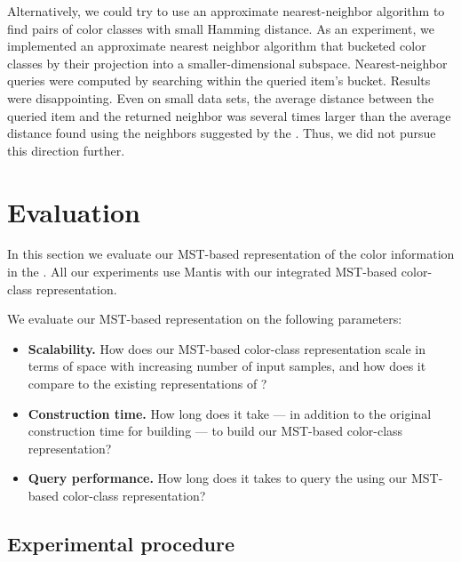 Alternatively, we could try to use an approximate nearest-neighbor
algorithm to find pairs of color classes with small Hamming distance.
As an experiment, we implemented an approximate nearest neighbor
algorithm that bucketed color classes by their projection into
a smaller-dimensional subspace.  Nearest-neighbor queries were
computed by searching within the queried item's bucket.
Results were disappointing.  Even on small data sets, the average
distance between the queried item and the returned neighbor
was several times larger than the average distance found using
the neighbors suggested by the \dbg.  Thus, we did not pursue
this direction further.

\section{Evaluation}
\label{sec:mantis_eval}

In this section we evaluate our MST-based representation of the color
information in the \cdbg.  All our experiments use Mantis with
our integrated MST-based color-class representation.


We evaluate our MST-based representation on the following parameters:
\begin{itemize}
    \item \textbf{Scalability.} How does our MST-based color-class representation
    scale in terms of space with increasing number of input samples, and how does
    it compare to the existing representations of \prevsys?

    \item \textbf{Construction time.} How long does it take --- in addition to
    the original construction time for building \cdbg --- to build
    our MST-based color-class representation?

    \item \textbf{Query performance.} How long does it takes to query the \cdbg
    using our MST-based color-class representation?
\end{itemize}
\subsection{Experimental procedure}

\label{experimental-proc}


